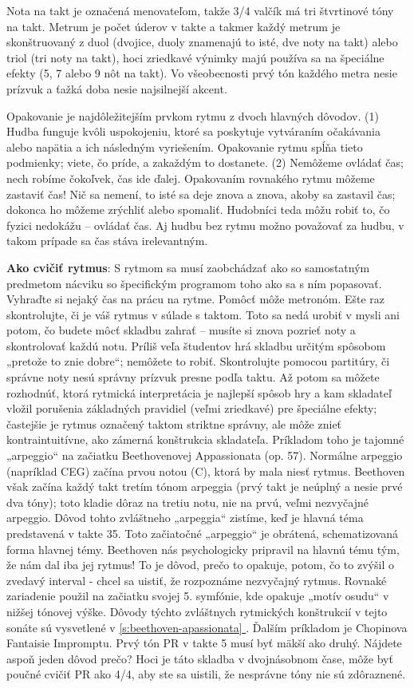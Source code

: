 \documentclass[11pt,a4paper]{book}
\newcommand*{\fullref}[1]{\hyperref[{#1}]{\ref*{#1} \nameref*{#1}}} %
\begin{document}
Nota na takt je označená menovateľom, takže 3/4 valčík má tri štvrtinové tóny na takt. Metrum je počet úderov v takte a takmer každý metrum je skonštruovaný z duol (dvojice, duoly znamenajú to isté, dve noty na takt) alebo triol (tri noty na takt), hoci zriedkavé výnimky majú používa sa na špeciálne efekty (5, 7 alebo 9 nôt na takt). Vo všeobecnosti prvý tón každého metra nesie prízvuk a ťažká doba nesie najsilnejší akcent.

Opakovanie je najdôležitejším prvkom rytmu z dvoch hlavných dôvodov. (1) Hudba funguje kvôli uspokojeniu, ktoré sa poskytuje vytváraním očakávania alebo napätia a ich následným vyriešením. Opakovanie rytmu spĺňa tieto podmienky; viete, čo príde, a zakaždým to dostanete. (2) Nemôžeme ovládať čas; nech robíme čokoľvek, čas ide ďalej. Opakovaním rovnakého rytmu môžeme zastaviť čas! Nič sa nemení, to isté sa deje znova a znova, akoby sa zastavil čas; dokonca ho môžeme zrýchliť alebo spomaliť. Hudobníci teda môžu robiť to, čo fyzici nedokážu – ovládať čas. Aj hudbu bez rytmu možno považovať za hudbu, v takom prípade sa čas stáva irelevantným.

\textbf{Ako cvičiť rytmus}: S rytmom sa musí zaobchádzať ako so samostatným predmetom nácviku so špecifickým programom toho ako sa s ním popasovať. Vyhraďte si nejaký čas na prácu na rytme. Pomôcť môže metronóm. Ešte raz skontrolujte, či je váš rytmus v súlade s taktom. Toto sa nedá urobiť v mysli ani potom, čo budete môcť skladbu zahrať – musíte si znova pozrieť noty a skontrolovať každú notu. Príliš veľa študentov hrá skladbu určitým spôsobom „pretože to znie dobre“; nemôžete to robiť. Skontrolujte pomocou partitúry, či správne noty nesú správny prízvuk presne podľa taktu. Až potom sa môžete rozhodnúť, ktorá rytmická interpretácia je najlepší spôsob hry a kam skladateľ vložil porušenia základných pravidiel (veľmi zriedkavé) pre špeciálne efekty; častejšie je rytmus označený taktom striktne správny, ale môže znieť kontraintuitívne, ako zámerná konštrukcia skladateľa. Príkladom toho je tajomné „arpeggio“ na začiatku Beethovenovej Appassionata (op. 57). Normálne arpeggio (napríklad CEG) začína prvou notou (C), ktorá by mala niesť rytmus. Beethoven však začína každý takt tretím tónom arpeggia (prvý takt je neúplný a nesie prvé dva tóny); toto kladie dôraz na tretiu notu, nie na prvú, veľmi nezvyčajné arpeggio. Dôvod tohto zvláštneho „arpeggia“ zistíme, keď je hlavná téma predstavená v takte 35. Toto začiatočné „arpeggio“ je obrátená, schematizovaná forma hlavnej témy. Beethoven nás psychologicky pripravil na hlavnú tému tým, že nám dal iba jej rytmus! To je dôvod, prečo to opakuje, potom, čo to zvýšil o zvedavý interval - chcel sa uistiť, že rozpoznáme nezvyčajný rytmus. Rovnaké zariadenie použil na začiatku svojej 5. symfónie, kde opakuje „motív osudu“ v nižšej tónovej výške. Dôvody týchto zvláštnych rytmických konštrukcií v tejto sonáte sú vysvetlené v \fullref{s:beethoven-apassionata}. Ďalším príkladom je Chopinova Fantaisie Impromptu. Prvý tón PR v takte 5 musí byť mäkší ako druhý. Nájdete aspoň jeden dôvod prečo? Hoci je táto skladba v dvojnásobnom čase, môže byť poučné cvičiť PR ako 4/4, aby ste sa uistili, že nesprávne tóny nie sú zdôraznené.
\end{document}
